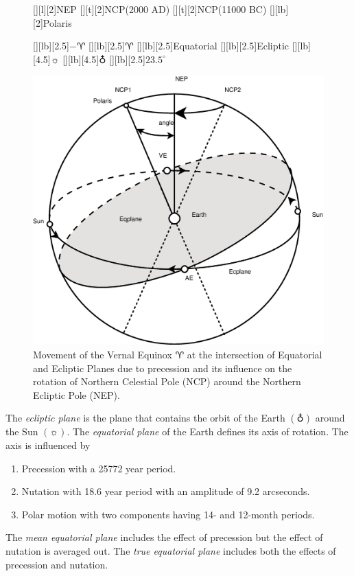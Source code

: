 \documentclass [12pt, a4paper] {article}
\begin{document}
\begin {figure}
  \begin {center}
     [][l][2]{NEP}
     [][t][2]{NCP(2000 AD)}
     [][t][2]{NCP(11000 BC)}
     [][lb][2]{Polaris}

     [][lb][2.5]{$-\aries$}
     [][lb][2.5]{$\aries$}
     [][lb][2.5]{Equatorial}
     [][lb][2.5]{Ecliptic}
     [][lb][4.5]{$\sun$}
     [][lb][4.5]{$\earth$}
     [][lb][2.5]{$23.5^\circ$}

     \includegraphics [angle=0, width=0.6\columnwidth] {figures/precession.eps}
     \caption{\label{fig:planes}Movement of the Vernal Equinox $\aries$ at the intersection of 
     Equatorial and Ecliptic Planes due to precession and its influence on the rotation 
     of Northern Celestial Pole (NCP) around the Northern Ecliptic Pole (NEP).}
  \end {center}
\end {figure} 
The \emph{ecliptic plane} is the plane that contains the orbit of the Earth $(\earth)$ around
the Sun $(\sun)$. The \emph{equatorial plane} of the Earth defines its axis of rotation. The axis is 
influenced by
\begin {enumerate}
  \item Precession with a 25772 year period. 
  \item Nutation with 18.6 year period with an amplitude of 9.2 arcseconds. 
  \item Polar motion with two components having 14- and 12-month periods.
\end {enumerate}
The \emph{mean equatorial plane} includes the effect of precession but the effect of nutation
is averaged out. The \emph{true equatorial plane} includes both the effects of precession 
and nutation.
\end{document}
